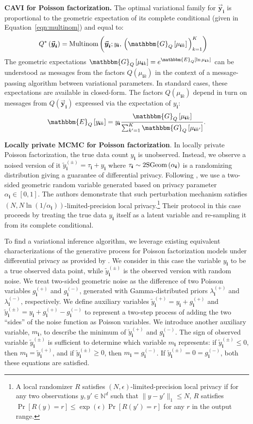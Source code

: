 \documentclass{article}
\newcommand{\subs}{\pmb{i}}
\newcommand{\wsup}[2]{#1_{\subs}^{(#2)}}
\newcommand{\ytP}{\wsup{\tilde{y}}{+}}
\newcommand{\ytPM}{\wsup{\tilde{y}}{\pm}}
\newcommand{\ysk}{y_{\subs k}}
\newcommand{\ys}{y_{\subs}}
\newcommand{\taus}{\tau_{\subs}}
\newcommand{\lamP}{\wsup{\lambda}{+}}
\newcommand{\lamM}{\wsup{\lambda}{-}}
\newcommand{\gP}{\wsup{g}{+}}
\newcommand{\gM}{\wsup{g}{-}}
\newcommand{\musk}{\mu_{\subs k}}
\newcommand{\ms}{m_{\subs}}
\newcommand{\yvs}{\vec{\boldsymbol{y}}_{\subs}}
\newcommand{\Multi}[1]{\textup{Multinom}\left( #1 \right)}
\newcommand{\Geo}[1]{\textup{2SGeom}\left( #1 \right)}
\newcommand{\Eq}[1]{\mathbbm{E}_Q\left[#1\right]}
\newcommand{\Gq}[1]{\mathbbm{G}_Q\left[#1\right]}
\begin{document}
  \textbf{CAVI for Poisson factorization.} The optimal variational family for
  $\yvs$ is proportional to the geometric expectation of its complete
  conditional (given in Equation~\ref{eqn:multinom}) and equal to:
  \begin{align}
  Q^*\left(\yvs\right) 
  &= \Multi{\yvs; \ys,\, \Big(\Gq{\musk}\Big)_{k=1}^K}
  \end{align}
  The geometric expectations $\Gq{\musk} = e^{\Eq{\ln \musk}}$ can be understood
  as messages from the factors $Q(\musk)$ in the context of a message-passing
  algorithm between variational parameters. In standard cases, these
  expectations are available in closed-form. The factors $Q(\musk)$ depend in
  turn on messages from $Q(\yvs)$ expressed via the expectation of $\ys$:
  \begin{equation}
      \Eq{\ysk}=\ys\frac{\Gq{\musk}}{\sum_{k'=1}^K \Gq{\mu_{\subs k'}}}.
  \end{equation}
  
  \textbf{Locally private MCMC for Poisson factorization}. In locally private
  Poisson factorization, the true data count $\ys$ is unobserved. Instead, we
  observe a noised version of it $\ytPM = \taus + \ys$ where $\taus \sim
  \Geo{\alpha_{\subs}}$ is a randomizing distribution giving a guarantee of
  differential privacy. Following \cite{schein2018locally}, we use a two-sided
  geometric random variable generated based on privacy parameter $\alpha_{\subs} \in [0,1]$.
  The authors demonstrate that such perturbation mechanism satisfies $(N, N
  \ln(1/\alpha_{\subs}))$-limited-precision local privacy.\footnote{A local
  randomizer $R$ satisfies $(N, \epsilon)$-limited-precision local privacy if
  for any two observations $y,y'\in \mathbb{N}^d$ such that $\|y-y'\|_1\leq N$,
  $R$ satisfies $\Pr[R(y) = r] \leq \exp(\epsilon)\Pr[R(y') = r]$ for any $r$ in
  the output range.} Their protocol in this case proceeds by treating the true data $\ys$
  itself as a latent variable and re-sampling it from its complete conditional.

  To find a variational inference algorithm, we leverage existing equivalent
  characterizations of the generative process for Poisson factorization models
  under differential privacy as provided by \citep{schein2018locally}. We
  consider in this case the variable $\ys$ to be a true observed data point,
  while $\ytPM$ is the observed version with random noise. We treat two-sided
  geometric noise as the difference of two Poisson variables $\gP$ and $\gM$,
  generated with Gamma-distributed priors $\lamP$ and $\lamM$, respectively. We
  define auxiliary variables $\ytP = \ys + \gP$ and $\ytPM = \ys + \gP - \gM$ to
  represent a two-step process of adding the two ``sides'' of the noise function
  as Poisson variables. We introduce another auxiliary variable, $\ms$, to
  describe the minimum of $\ytP$ and $\gM$. The sign of observed variable
  $\ytPM$ is sufficient to determine which variable $\ms$ represents: if $\ytPM
  \leq 0$, then $\ms = \ytP$, and if $\ytPM \geq 0$, then $\ms = \gM$. If $\ytPM
  = 0 = \gM$, both these equations are satisfied.
\end{document}
